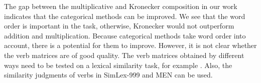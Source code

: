 The gap between the multiplicative and Kronecker composition in our work indicates that the categorical methods can be improved. We see that the word order is important in the task, otherwise, Kronecker would not outperform addition and multiplication. Because categorical methods take word order into account, there is a potential for them to improve. However, it is not clear whether the verb matrices are of good quality. The verb matrices obtained by different ways need to be tested on a lexical similarity task, for example . Also, the similarity judgments of verbs in SimLex-999 and MEN can be used.



